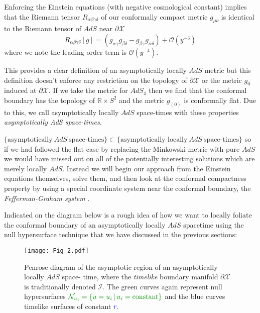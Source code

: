 \documentclass[a4paper,11pt]{article}
\numberwithin{equation}{section}
\begin{document}
Enforcing the  Einstein equations (with negative cosmological constant) implies that the Riemann tensor $R_{\alpha \beta \gamma \delta}$ of our conformally compact metric $g_{\mu \nu}$ is identical to the Riemann tensor of $AdS$ near $\partial \mathcal{X}$
\begin{equation}
R_{\alpha \beta \gamma \delta}[g]=(g_{\alpha \gamma} g_{\beta \delta} - g_{\beta \gamma} g_{\alpha \delta})+\mathcal{O}(y^{-3})
\end{equation}
where we note the leading order term is $\mathcal{O}(y^{-4})$. 

This provides a clear definition of an asymptotically locally $AdS$ metric but this definition doesn't enforce any restriction on the topology of $\partial \mathcal{X}$ or the metric $g_{0}$ induced at $\partial \mathcal{X}$. If we take the metric for $AdS_4$ then we find that the conformal boundary has the topology of $\mathbb{R} \times S^2$ and the metric $g_{(0)}$ is conformally flat. Due to this, we call asymptotically locally $AdS$ space-times with these properties \textit{asymptotically AdS space-times}.
 
$\{ \text{asymptotically} \: AdS \: \text{space-times} \} \subset \{ \text{asymptotically locally} \: AdS \: \text{space-times} \}$ so if we had followed the flat case by replacing the Minkowski metric with pure $AdS$ we would have missed out on all of the potentially interesting solutions which are merely locally $AdS$. Instead we will begin our approach from the Einstein equations themselves, solve them, and then look at the conformal compactness property by using a special coordinate system near the conformal boundary, the \textit{Fefferman-Graham system} \cite{Fefferman:1985zza}.

Indicated on the diagram below is a rough idea of how we want to locally foliate the conformal boundary of an asymptotically locally $AdS$ spacetime using the null hypersurface technique that we have discussed in the previous sections: \newpage

\begin{figure}[H]
\begin{center}
	\texttt{[image: Fig\_2.pdf]}
	\caption{Penrose diagram of the asymptotic region of an asymptotically locally $AdS$ space-	time, where the \textit{timelike} boundary manifold $\partial \mathcal{X}$ is traditionally 		denoted $\mathscr{I}$. The \textcolor{islamicgreen}{green} curves again represent null 		hypersurfaces $\color{islamicgreen}{\mathcal{N}_{u_i}} =\{ u= u_i \, | \, u_i = \text{constant} \}$  	and the blue curves timelike surfaces of constant $\color{blue}{r}.$}
\end{center}	
\end{figure}
\end{document}
